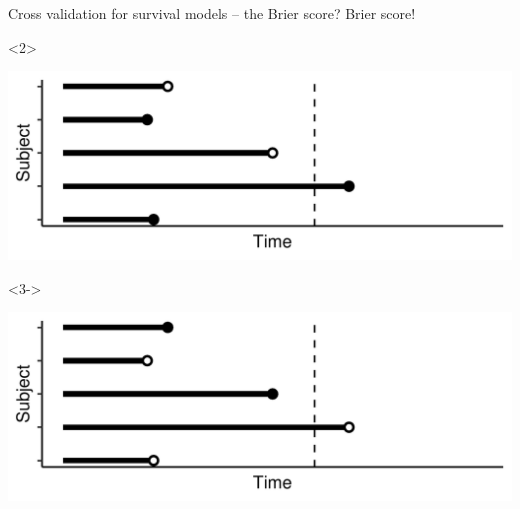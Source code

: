\documentclass[smaller]{beamer}\usepackage{listings}
\begin{document}
\begin{frame}[label={sec:orgf62cea5}]{Cross validation for survival models -- the Brier score?}
\center \Large Brier score! 

\vfill


\begin{onlyenv}<2>
\begin{center}
\includegraphics[width=.9\linewidth]{./fig-observed-data.pdf}
\end{center}
\end{onlyenv}

\begin{onlyenv}<3->
\begin{center}
\includegraphics[width=.9\linewidth]{./fig-inverse-data.pdf}
\end{center}
\end{onlyenv}
\end{frame}
\end{document}
